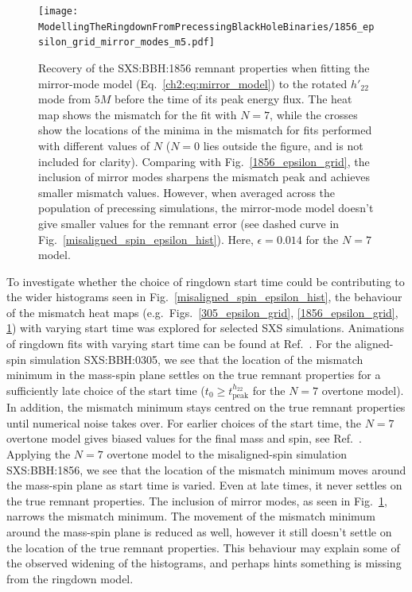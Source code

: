 \begin{figure}[t]
    \centering
    \texttt{[image: ModellingTheRingdownFromPrecessingBlackHoleBinaries/1856\_epsilon\_grid\_mirror\_modes\_m5.pdf]}
    \caption[Recovery of SXS:BBH:1856 remnant properties using the mirror-mode model]{ 
    Recovery of the SXS:BBH:1856 remnant properties when fitting the mirror-mode model (Eq.~\ref{ch2:eq:mirror_model}) to the rotated $h'_{22}$ mode from $5M$ before the time of its peak energy flux.
    The heat map shows the mismatch for the fit with $N=7$, while the crosses show the locations of the minima in the mismatch for fits performed with different values of $N$ ($N=0$ lies outside the figure, and is not included for clarity). 
    Comparing with Fig.~\ref{1856_epsilon_grid}, the inclusion of mirror modes sharpens the mismatch peak and achieves smaller mismatch values. 
    However, when averaged across the population of precessing simulations, the mirror-mode model doesn't give smaller values for the remnant error (see dashed curve in Fig.~\ref{misaligned_spin_epsilon_hist}). 
    Here, $\epsilon = 0.014$ for the $N=7$ model.
    }
    \label{1856_mirror_mode_epsilon_grid}
\end{figure}

To investigate whether the choice of ringdown start time could be contributing to the wider histograms seen in Fig.~\ref{misaligned_spin_epsilon_hist}, the behaviour of the mismatch heat maps (e.g.\ Figs.~\ref{305_epsilon_grid}, \ref{1856_epsilon_grid}, \ref{1856_mirror_mode_epsilon_grid}) with varying start time was explored for selected SXS simulations. 
Animations of ringdown fits with varying start time can be found at Ref.~\cite{finch_eliot_2021_4538194}.
For the aligned-spin simulation SXS:BBH:0305, we see that the location of the mismatch minimum in the mass-spin plane settles on the true remnant properties for a sufficiently late choice of the start time ($t_0 \geq t_{\mathrm{peak}}^{h_{22}}$ for the $N=7$ overtone model). 
In addition, the mismatch minimum stays centred on the true remnant properties until numerical noise takes over.
For earlier choices of the start time, the $N=7$ overtone model gives biased values for the final mass and spin, see Ref.~\cite{finch_eliot_2021_4538194}.
Applying the $N=7$ overtone model to the misaligned-spin simulation SXS:BBH:1856, we see that the location of the mismatch minimum moves around the mass-spin plane as start time is varied. Even at late times, it never settles on the true remnant properties.
The inclusion of mirror modes, as seen in Fig.~\ref{1856_mirror_mode_epsilon_grid}, narrows the mismatch minimum. The movement of the mismatch minimum around the mass-spin plane is reduced as well, however it still doesn't settle on the location of the true remnant properties.
This behaviour may explain some of the observed widening of the histograms, and perhaps hints something is missing from the ringdown model.


